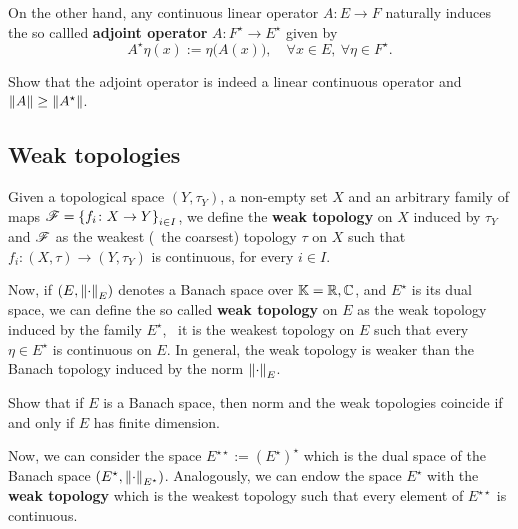 On the other hand, any continuous linear operator $A\colon E\to F$ naturally induces the so callled \textbf{adjoint operator} $A\colon F^{\star}\to E^{\star}$ given by
\begin{displaymath}
  A^{\star}\eta(x):=\eta\big(A(x)\big),\quad\forall x\in E,\ \forall\eta\in F^{\star}.
\end{displaymath}

\begin{exercise}
  Show that the adjoint operator is indeed a linear continuous operator and $\left\|{A}\right\|\geq\left\|{A^{\star}}\right\|$.
\end{exercise}



\subsection{Weak topologies}\label{sec:weak-topologies}

Given a topological space $(Y,\tau_{Y})$, a non-empty set $X$ and an arbitrary family of maps $\mathscr{F}={\{f_{i}\colon X\to Y\}}_{i\in I}$, we define the \textbf{weak topology} on $X$ induced by $\tau_{Y}$ and $\mathscr{F}$ as the weakest (\ie~the coarsest) topology $\tau$ on $X$ such that $f_{i}\colon (X,\tau)\to (Y,\tau_{Y})$ is continuous, for every $i\in I$.

Now, if $(E,\left\|{\cdot}\right\|_{E})$ denotes a Banach space over $\mathbb{K}=\mathbb{R},\mathbb{C}$, and $E^{\star}$ is its dual space, we can define the so called \textbf{weak topology} on $E$ as the weak topology induced by the family $E^{\star}$, \ie~it is the weakest topology on $E$ such that every $\eta\in E^{\star}$ is continuous on $E$. In general, the weak topology is weaker than the Banach topology induced by the norm $\left\|{\cdot}\right\|_{E}$.

\begin{exercise}
  Show that if $E$ is a Banach space, then norm and the weak topologies coincide if and only if $E$ has finite dimension.
\end{exercise}

Now, we can consider the space $E^{\star\star}:={(E^{\star})}^{\star}$ which is the dual space of the Banach space $(E^{\star},\left\|{\cdot}\right\|_{E^{\star}})$. Analogously, we can endow the space $E^{\star}$ with the \textbf{weak topology} which is the weakest topology such that every element of $E^{\star\star}$ is continuous.

